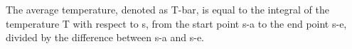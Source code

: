 The average temperature, denoted as T-bar, is equal to the integral of the temperature T with respect to s, from the start point s-a to the end point s-e, divided by the difference between s-a and s-e.